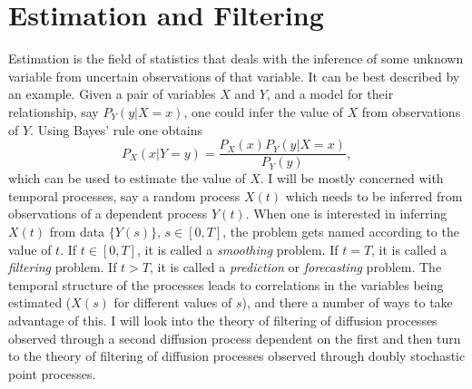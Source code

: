 {\section{Estimation and Filtering}

Estimation is the field of statistics that deals with the inference of some unknown variable from uncertain observations of that variable. It can be best described by an example. Given a pair of variables $X$ and $Y$, and a model for their relationship, say $P_Y(y|X=x)$, one could infer the value of $X$ from observations of $Y$. Using Bayes' rule one obtains
\[
P_X(x|Y=y) = \frac{P_X(x)P_Y(y|X=x)}{P_Y(y)},
\]
which can be used to estimate the value of $X$.
I will be mostly concerned with temporal processes, say a random process $X(t)$ which needs to be inferred from observations of a 
dependent process $Y(t)$. When one is interested in inferring $X(t)$ from data $\{Y(s)\},\,s \in [0,T]$, the problem gets named according 
to the value of $t$. If $t \in [0,T]$, it is called a \emph{smoothing} problem. If $t = T$, it is called a \emph{filtering} problem. If $t>T$, it is called a \emph{prediction} or 
\emph{forecasting} problem. The temporal structure of the processes leads to correlations in the variables being 
estimated ($X(s)$ for different values of $s$), and there a number of ways to take advantage of this. I will look into the theory of filtering of 
diffusion processes observed through a second diffusion process dependent on the first and then turn to the theory of filtering of diffusion processes observed through 
doubly stochastic point processes.

}
